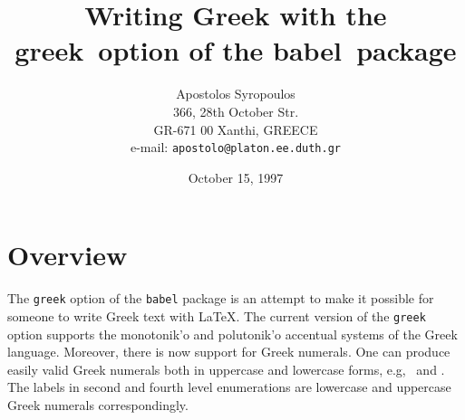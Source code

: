 \documentclass[11pt]{article}
\newcommand{\langGreek}{\foreignlanguage{greek}}
\begin{document}
{}

\title{Writing Greek with the \ttfamily greek\rmfamily\  option of the
\ttfamily babel\rmfamily\ package}
\author{Apostolos Syropoulos\\
        366, 28th October Str.\\
        GR-671 00 Xanthi, GREECE\\
        e-mail: \texttt{apostolo@platon.ee.duth.gr}}
\date{October 15, 1997}
\maketitle



\section{Overview}

The \texttt{greek} option of the \texttt{babel} package is an attempt to
make it possible for someone to write Greek text with \LaTeX. The current
version of the \texttt{greek} option supports the
\langGreek{monotonik'o} and \langGreek{polutonik'o}
accentual systems of the Greek language.
Moreover, there is now support for Greek numerals. One can produce easily
valid Greek numerals both in uppercase and lowercase forms, e.g,
\langGreek{}\ and \langGreek{}. The
labels in second and fourth level enumerations are lowercase
and uppercase Greek numerals correspondingly.
\end{document}
